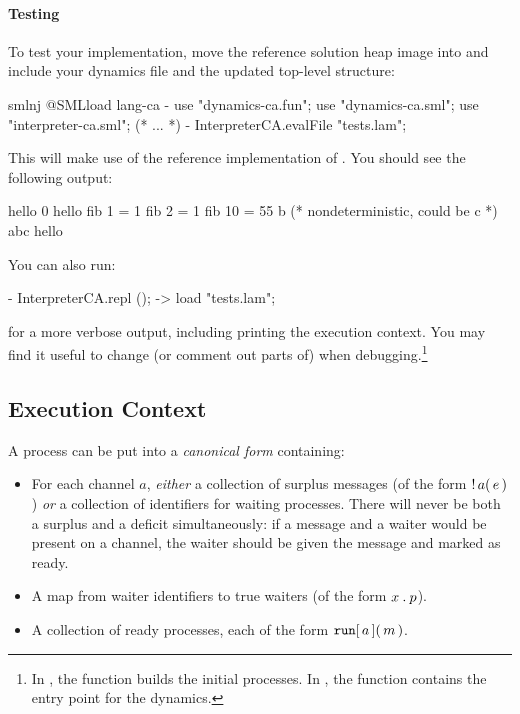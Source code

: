 \documentclass[11pt]{article}
\begin{document}
\paragraph{Testing}
To test your implementation, move the reference solution heap image into  and include your dynamics file and the updated top-level structure:
\begin{codeblock}
  smlnj @SMLload lang-ca
  - use "dynamics-ca.fun"; use "dynamics-ca.sml"; use "interpreter-ca.sml";
  (* ... *)
  - InterpreterCA.evalFile "tests.lam";
\end{codeblock}
This will make use of the reference implementation of .
You should see the following output:
\begin{codeblock}
  hello
  0
  hello
  fib  1 = 1
  fib  2 = 1
  fib 10 = 55
  b  (* nondeterministic, could be c *)
  abc
  hello
\end{codeblock}
You can also run:
\begin{codeblock}
  - InterpreterCA.repl ();
  -> load "tests.lam";
\end{codeblock}
for a more verbose output, including printing the execution context.
You may find it useful to change (or comment out parts of)  when debugging.\footnote{
  In , the function  builds the initial processes.
  In , the function  contains the entry point for the dynamics.
}

\subsection{Execution Context}

A process can be put into a \emph{canonical form} containing:
\begin{itemize}
  \item
        For each channel $a$, \emph{either} a collection of surplus messages (of the form $\mathop{\mathtt{!}}\nolimits{a}\mathtt{(}\,e\,\mathtt{)}$) \emph{or} a collection of identifiers for waiting processes.
        There will never be both a surplus and a deficit simultaneously: if a message and a waiter would be present on a channel, the waiter should be given the message and marked as ready.
  \item
        A map from waiter identifiers to true waiters (of the form ${x}\mathbin{\mathtt{.}}{p}$).
  \item
        A collection of ready processes, each of the form ${{\mathtt{run}}\mathtt{[}\,{a}\,\mathtt{]}}\mathtt{(}\,m\,\mathtt{)}$.
\end{itemize}
\end{document}

